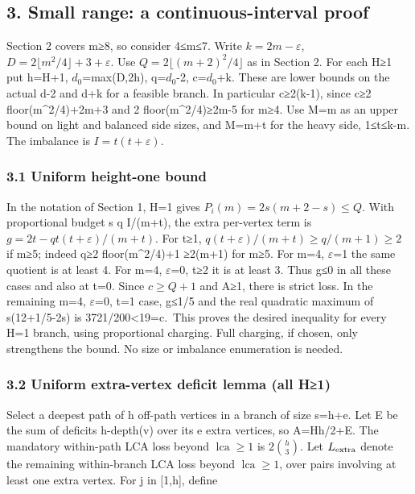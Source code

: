 \documentclass[
  10pt,
  a4paper,
]{article}
\begin{document}
\subsection{3. Small range: a continuous-interval
proof}\label{small-range-a-continuous-interval-proof}

Section 2 covers m≥8, so consider 4≤m≤7. Write \(k=2m-\varepsilon\),
\(D=2\lfloor m^2/4\rfloor+3+\varepsilon\). Use
\(Q=2\lfloor(m+2)^2/4\rfloor\) as in Section 2. For each H≥1 put h=H+1,
\(d_0\)=max(D,2h), q=\(d_0\)-2, c=\(d_0\)+k. These are lower bounds on
the actual d-2 and d+k for a feasible branch. In particular c≥2(k-1),
since c≥2 floor(m\^{}2/4)+2m+3 and 2 floor(m\^{}2/4)≥2m-5 for m≥4. Use
M=m as an upper bound on light and balanced side sizes, and M=m+t for
the heavy side, 1≤t≤k-m. The imbalance is \(I=t(t+\varepsilon)\).

\subsubsection{3.1 Uniform height-one
bound}\label{uniform-height-one-bound}

In the notation of Section 1, H=1 gives \(P_i(m)=2s(m+2-s)\le Q\). With
proportional budget s q I/(m+t), the extra per-vertex term is
\(g=2t-qt(t+\varepsilon)/(m+t)\). For t≥1,
\(q(t+\varepsilon)/(m+t)\ge q/(m+1)\ge2\) if m≥5; indeed q≥2
floor(m\^{}2/4)+1 ≥2(m+1) for m≥5. For m=4, \(\varepsilon\)=1 the same
quotient is at least 4. For m=4, \(\varepsilon\)=0, t≥2 it is at least
3. Thus g≤0 in all these cases and also at t=0. Since \(c\ge Q+1\) and
A≥1, there is strict loss. In the remaining m=4, \(\varepsilon\)=0, t=1
case, g≤1/5 and the real quadratic maximum of s(12+1/5-2s) is
3721/200\textless19=c.~This proves the desired inequality for every H=1
branch, using proportional charging. Full charging, if chosen, only
strengthens the bound. No size or imbalance enumeration is needed.

\subsubsection{3.2 Uniform extra-vertex deficit lemma (all
H≥1)}\label{uniform-extra-vertex-deficit-lemma-all-h1}

Select a deepest path of h off-path vertices in a branch of size s=h+e.
Let E be the sum of deficits h-depth(v) over its e extra vertices, so
A=Hh/2+E. The mandatory within-path LCA loss beyond
\(\operatorname{lca}\ge1\) is \(2\binom h3\). Let \(L_{\rm extra}\)
denote the remaining within-branch LCA loss beyond
\(\operatorname{lca}\ge1\), over pairs involving at least one extra
vertex. For j in {[}1,h{]}, define
\end{document}
